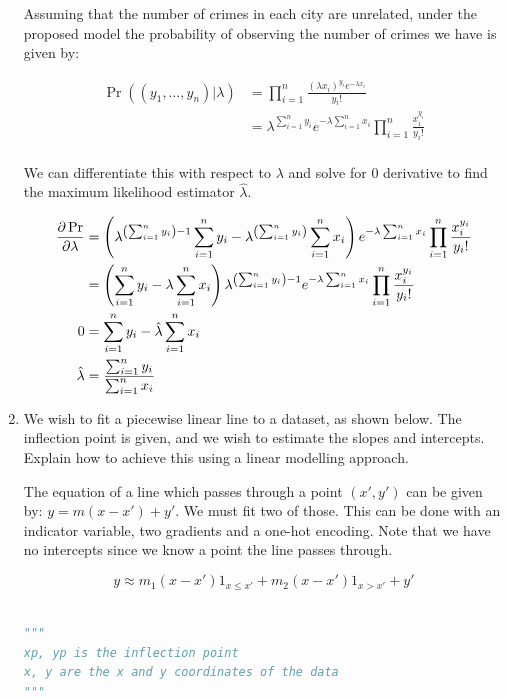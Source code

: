 \documentclass[10pt,\jkfside,a4paper]{article}
\begin{document}
\begin{enumerate}
Assuming that the number of crimes in each city are unrelated, under the
proposed model the probability of observing the number of crimes we have is
given by:

\[
\begin{split}
\Pr((y_1, \dots, y_n) | \lambda) &=
\prod^n_{i=1} \frac{\left( \lambda x_i \right)^{y_i} e^{-\lambda x_i}}{y_i
!} \\
&= \lambda^{\sum^n_{i=1}y_i}e^{-\lambda\sum^n_{i=1}x_i} \prod^n_{i=1}
\frac{x_i^{y_i}}{y_i!} \\
\end{split}
\]

We can differentiate this with respect to $\lambda$ and solve for 0
derivative to find the maximum likelihood estimator $\hat{\lambda}$.

\[
\begin{split}
\pdv{\Pr}{\lambda} &=
\left(\lambda^{\left( \sum^n_{i=1}y_i \right) - 1}\sum^n_{i=1}y_i -
\lambda^{\left( \sum^n_{i=1}y_i \right)}\sum^n_{i=1} x_i\right)e^{-\lambda
\sum^n_{i=1}x_i } \prod^n_{i=1}\frac{x_i^{y_i}}{y_i!} \\
&= \left( \sum^n_{i=1}y_i - \lambda\sum^n_{i=1} x_i\right) \lambda^{\left(
\sum^n_{i=1}y_i \right)- 1}e^{-\lambda\sum^n_{i=1}x_i }
\prod^n_{i=1}\frac{x_i^{y_i}}{y_i!} \\
0 &= \sum^n_{i=1}y_i - \hat{\lambda}\sum^n_{i=1} x_i \\
\hat{\lambda} &= \frac{\sum^n_{i=1}y_i}{\sum^n_{i=1} x_i} \\
\end{split}
\]

\item We wish to fit a piecewise linear line to a dataset, as shown below.
The inflection point is given, and we wish to estimate the slopes and
intercepts. Explain how to achieve this using a linear modelling approach.

The equation of a line which passes through a point $(x', y')$ can be given by:
$y = m(x - x') + y'$. We must fit two of those. This can be done with an
indicator variable, two gradients and a one-hot encoding. Note that we have
no intercepts since we know a point the line passes through.

\[
y \approx m_1 (x - x') 1_{x \leq x'} + m_2 (x - x') 1_{x > x'} + y'
\]

\begin{lstlisting}[language=Python]

"""
xp, yp is the inflection point
x, y are the x and y coordinates of the data
"""


\end{lstlisting}
\end{enumerate}
\end{document}
